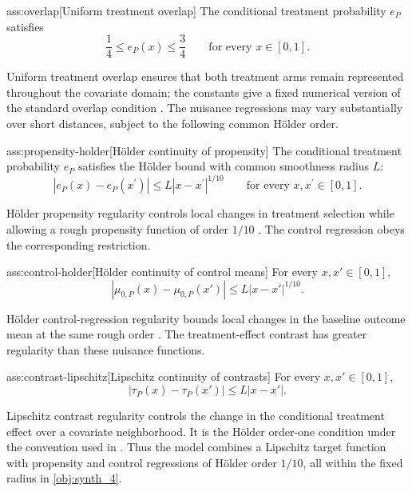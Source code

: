 \documentclass[11pt]{article}
\begin{document}
\begin{assumptionv}{ass:overlap}[Uniform treatment overlap]
The conditional treatment probability \(e_P\) satisfies
\[
\frac14\le e_P(x)\le\frac34
\qquad\text{for every }x\in[0,1].
\]
\end{assumptionv}

Uniform treatment overlap ensures that both treatment arms remain represented throughout the covariate domain; the constants give a fixed numerical version of the standard overlap condition \citep{KennedyBalakrishnanRobinsWasserman2024}. The nuisance regressions may vary substantially over short distances, subject to the following common Hölder order.

\begin{assumptionv}{ass:propensity-holder}[Hölder continuity of propensity]
The conditional treatment probability \(e_P\) satisfies the Hölder bound with common smoothness radius \(L\):
\[
|e_P(x)-e_P(x^{\prime})|
\le L|x-x^{\prime}|^{1/10}
\qquad\text{for every }x,x^{\prime}\in[0,1].
\]
\end{assumptionv}

Hölder propensity regularity controls local changes in treatment selection while allowing a rough propensity function of order \(1/10\) \citep{KennedyBalakrishnanRobinsWasserman2024}. The control regression obeys the corresponding restriction.

\begin{assumptionv}{ass:control-holder}[Hölder continuity of control means]
For every \(x,x'\in[0,1]\),
\[
|\mu_{0,P}(x)-\mu_{0,P}(x')|
\le L|x-x'|^{1/10}.
\]
\end{assumptionv}

Hölder control-regression regularity bounds local changes in the baseline outcome mean at the same rough order \citep{KennedyBalakrishnanRobinsWasserman2024}. The treatment-effect contrast has greater regularity than these nuisance functions.

\begin{assumptionv}{ass:contrast-lipschitz}[Lipschitz continuity of contrasts]
For every \(x,x'\in[0,1]\),
\[
|\tau_P(x)-\tau_P(x')|
\le L|x-x'|.
\]
\end{assumptionv}

Lipschitz contrast regularity controls the change in the conditional treatment effect over a covariate neighborhood. It is the Hölder order-one condition under the convention used in \citep{KennedyBalakrishnanRobinsWasserman2024}. Thus the model combines a Lipschitz target function with propensity and control regressions of Hölder order \(1/10\), all within the fixed radius in \cref{obj:synth_4}.
\end{document}
